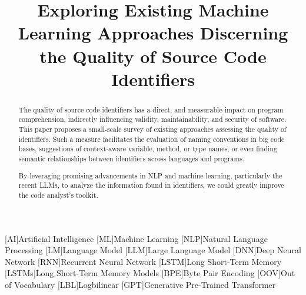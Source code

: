\documentclass[conference]{IEEEtran}
\begin{document}

[AI]{Artificial Intelligence}
[ML]{Machine Learning}
[NLP]{Natural Language Processing}
[LM]{Language Model}
[LLM]{Large Language Model}
[DNN]{Deep Neural Network}
[RNN]{Recurrent Neural Network}
[LSTM]{Long Short-Term Memory}
[LSTMs]{Long Short-Term Memory Models}
[BPE]{Byte Pair Encoding}
[OOV]{Out of Vocabulary}
[LBL]{Logbilinear}
[GPT]{Generative Pre-Trained Transformer}

\title{Exploring Existing Machine Learning Approaches Discerning the Quality of Source
Code Identifiers}

\author{
\and
{}
}

\maketitle

\begin{abstract}
    The quality of source code identifiers has a direct, and measurable impact on program
    comprehension, indirectly influencing validity, maintainability, and security of
    software. This paper proposes a small-scale survey of existing approaches assessing
    the quality of identifiers. Such a measure facilitates the evaluation of naming
    conventions in big code bases, suggestions of context-aware variable, method, or type
    names, or even finding semantic relationships between identifiers across languages and
    programs.

    By leveraging promising advancements in \ac{NLP} and machine learning, particularly
    the recent \acp{LLM}, to analyze the information found in identifiers, we could
    greatly improve the code analyst's toolkit.
\end{abstract}
\end{document}

